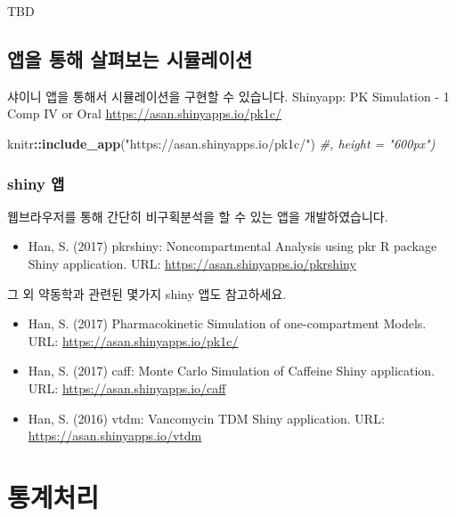 \documentclass[
  12pt,
]{krantz}
\newenvironment{Shaded}{\begin{snugshade}}{\end{snugshade}}
\newcommand{\CommentTok}[1]{\textcolor[rgb]{0.56,0.35,0.01}{\textit{#1}}}
\newcommand{\KeywordTok}[1]{\textcolor[rgb]{0.13,0.29,0.53}{\textbf{#1}}}
\newcommand{\NormalTok}[1]{#1}
\newcommand{\OperatorTok}[1]{\textcolor[rgb]{0.81,0.36,0.00}{\textbf{#1}}}
\newcommand{\StringTok}[1]{\textcolor[rgb]{0.31,0.60,0.02}{#1}}
\providecommand{\tightlist}{%
  \setlength{\itemsep}{0pt}\setlength{\parskip}{0pt}}
\begin{document}
TBD

\hypertarget{sim-app}{%
\section{앱을 통해 살펴보는 시뮬레이션}\label{sim-app}}

샤이니 앱을 통해서 시뮬레이션을 구현할 수 있습니다. Shinyapp: PK Simulation - 1 Comp IV or Oral \url{https://asan.shinyapps.io/pk1c/}

\begin{Shaded}
\begin{Highlighting}[]
\NormalTok{knitr}\OperatorTok{::}\KeywordTok{include\_app}\NormalTok{(}\StringTok{"https://asan.shinyapps.io/pk1c/"}\NormalTok{) }\CommentTok{\#, height = "600px")}
\end{Highlighting}
\end{Shaded}

\hypertarget{shiny}{%
\subsection{shiny 앱}\label{shiny}}

웹브라우저를 통해 간단히 비구획분석을 할 수 있는 앱을 개발하였습니다.

\begin{itemize}
\tightlist
\item
  Han, S. (2017) pkrshiny: Noncompartmental Analysis using pkr R package Shiny application. URL: \url{https://asan.shinyapps.io/pkrshiny}
\end{itemize}

그 외 약동학과 관련된 몇가지 shiny 앱도 참고하세요.

\begin{itemize}
\tightlist
\item
  Han, S. (2017) Pharmacokinetic Simulation of one-compartment Models. URL: \url{https://asan.shinyapps.io/pk1c/}
\item
  Han, S. (2017) caff: Monte Carlo Simulation of Caffeine Shiny application. URL: \url{https://asan.shinyapps.io/caff}
\item
  Han, S. (2016) vtdm: Vancomycin TDM Shiny application. URL: \url{https://asan.shinyapps.io/vtdm}
\end{itemize}

\hypertarget{statistics}{%
\chapter{통계처리}\label{statistics}}
\end{document}
